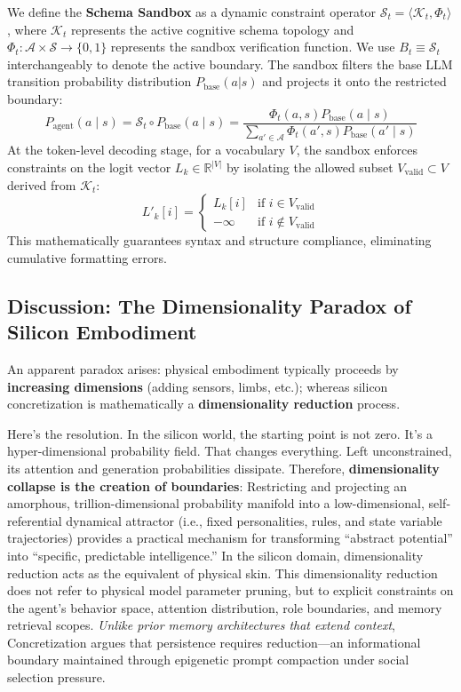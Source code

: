 \documentclass[10pt,journal,compsoc]{IEEEtran}
\begin{document}
We define the \textbf{Schema Sandbox} as a dynamic constraint operator $\mathcal{S}_t = \langle \mathcal{K}_t, \Phi_t \rangle$, where $\mathcal{K}_t$ represents the active cognitive schema topology and $\Phi_t: \mathcal{A} \times \mathcal{S} \to \{0, 1\}$ represents the sandbox verification function. We use $B_t \equiv \mathcal{S}_t$ interchangeably to denote the active boundary. The sandbox filters the base LLM transition probability distribution $P_{\text{base}}(a|s)$ and projects it onto the restricted boundary:
\begin{equation}
P_{\text{agent}}(a \mid s) = \mathcal{S}_t \circ P_{\text{base}}(a \mid s) = \frac{\Phi_t(a, s) P_{\text{base}}(a \mid s)}{\sum_{a' \in \mathcal{A}} \Phi_t(a', s) P_{\text{base}}(a' \mid s)}
\end{equation}
At the token-level decoding stage, for a vocabulary $V$, the sandbox enforces constraints on the logit vector $L_k \in \mathbb{R}^{|V|}$ by isolating the allowed subset $V_{\text{valid}} \subset V$ derived from $\mathcal{K}_t$:
\begin{equation}
L'_k[i] = \begin{cases} L_k[i] & \text{if } i \in V_{\text{valid}} \\ -\infty & \text{if } i \notin V_{\text{valid}} \end{cases}
\end{equation}
This mathematically guarantees syntax and structure compliance, eliminating cumulative formatting errors.

\subsection{Discussion: The Dimensionality Paradox of Silicon Embodiment}
An apparent paradox arises: physical embodiment typically proceeds by \textbf{increasing dimensions} (adding sensors, limbs, etc.); whereas silicon concretization is mathematically a \textbf{dimensionality reduction} process.

Here's the resolution. In the silicon world, the starting point is not zero. It's a hyper-dimensional probability field. That changes everything. Left unconstrained, its attention and generation probabilities dissipate. Therefore, \textbf{dimensionality collapse is the creation of boundaries}: Restricting and projecting an amorphous, trillion-dimensional probability manifold into a low-dimensional, self-referential dynamical attractor (i.e., fixed personalities, rules, and state variable trajectories) provides a practical mechanism for transforming ``abstract potential'' into ``specific, predictable intelligence.'' In the silicon domain, dimensionality reduction acts as the equivalent of physical skin. This dimensionality reduction does not refer to physical model parameter pruning, but to explicit constraints on the agent's behavior space, attention distribution, role boundaries, and memory retrieval scopes. \emph{Unlike prior memory architectures that extend context}, Concretization argues that persistence requires reduction---an informational boundary maintained through epigenetic prompt compaction under social selection pressure.
\end{document}
